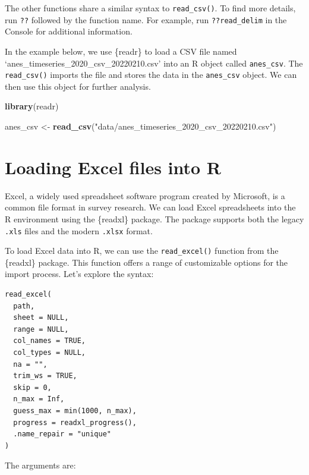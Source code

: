 \documentclass[
]{krantz}
\makeatletter
\newenvironment{Shaded}{\begin{snugshade}}{\end{snugshade}}
\newcommand{\FunctionTok}[1]{\textcolor[rgb]{0.27,0.27,0.27}{\textbf{#1}}}
\newcommand{\NormalTok}[1]{#1}
\newcommand{\OtherTok}[1]{\textcolor[rgb]{0.37,0.37,0.37}{#1}}
\newcommand{\StringTok}[1]{\textcolor[rgb]{0.5,0.5,0.5}{#1}}
\newenvironment{kframe}{%
\medskip{}
\setlength{\fboxsep}{.8em}
 \def\at@end@of@kframe{}%
 \ifinner\ifhmode%
  \def\at@end@of@kframe{\end{minipage}}%
  \begin{minipage}{\columnwidth}%
 \fi\fi%
 \def\FrameCommand##1{\hskip\@totalleftmargin \hskip-\fboxsep
 \colorbox{shadecolor}{##1}\hskip-\fboxsep
     \hskip-\linewidth \hskip-\@totalleftmargin \hskip\columnwidth}%
 \MakeFramed {\advance\hsize-\width
   \@totalleftmargin\z@ \linewidth\hsize
   \@setminipage}}%
 {\par\unskip\endMakeFramed%
 \at@end@of@kframe}
\renewenvironment{Shaded}{\begin{kframe}}{\end{kframe}}
\makeatother
\begin{document}
The other functions share a similar syntax to \texttt{read\_csv()}. To find more details, run \texttt{??} followed by the function name. For example, run \texttt{??read\_delim} in the Console for additional information.

In the example below, we use \{readr\} to load a CSV file named `anes\_timeseries\_2020\_csv\_20220210.csv' into an R object called \texttt{anes\_csv}. The \texttt{read\_csv()} imports the file and stores the data in the \texttt{anes\_csv} object. We can then use this object for further analysis.

\begin{Shaded}
\begin{Highlighting}[]
\FunctionTok{library}\NormalTok{(readr)}

\NormalTok{anes\_csv }\OtherTok{\textless{}{-}}
  \FunctionTok{read\_csv}\NormalTok{(}\StringTok{"data/anes\_timeseries\_2020\_csv\_20220210.csv"}\NormalTok{)}
\end{Highlighting}
\end{Shaded}

\hypertarget{loading-excel-files-into-r}{%
\section{Loading Excel files into R}\label{loading-excel-files-into-r}}

Excel, a widely used spreadsheet software program created by Microsoft, is a common file format in survey research. We can load Excel spreadsheets into the R environment using the \{readxl\} package. The package supports both the legacy \texttt{.xls} files and the modern \texttt{.xlsx} format.

To load Excel data into R, we can use the \texttt{read\_excel()} function from the \{readxl\} package. This function offers a range of customizable options for the import process. Let's explore the syntax:

\begin{verbatim}
read_excel(
  path,
  sheet = NULL,
  range = NULL,
  col_names = TRUE,
  col_types = NULL,
  na = "",
  trim_ws = TRUE,
  skip = 0,
  n_max = Inf,
  guess_max = min(1000, n_max),
  progress = readxl_progress(),
  .name_repair = "unique"
)
\end{verbatim}

The arguments are:
\end{document}
